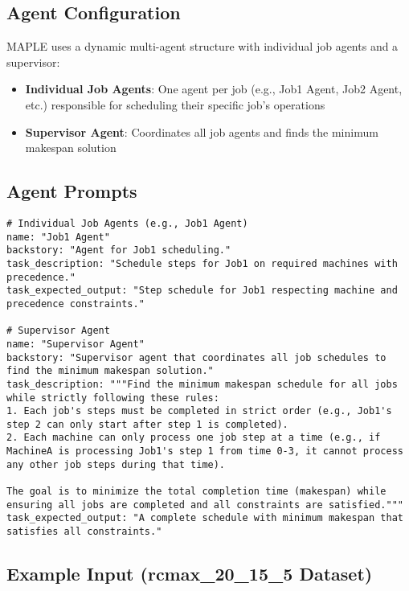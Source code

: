 \documentclass[11pt]{article}
\begin{document}
\subsection{Agent Configuration}

MAPLE uses a dynamic multi-agent structure with individual job agents and a supervisor:

\begin{itemize}
    \item \textbf{Individual Job Agents}: One agent per job (e.g., Job1 Agent, Job2 Agent, etc.) responsible for scheduling their specific job's operations
    \item \textbf{Supervisor Agent}: Coordinates all job agents and finds the minimum makespan solution
\end{itemize}

\subsection{Agent Prompts}

\begin{lstlisting}[caption=MAPLE Agent Prompts]
# Individual Job Agents (e.g., Job1 Agent)
name: "Job1 Agent"
backstory: "Agent for Job1 scheduling."
task_description: "Schedule steps for Job1 on required machines with precedence."
task_expected_output: "Step schedule for Job1 respecting machine and precedence constraints."

# Supervisor Agent
name: "Supervisor Agent"
backstory: "Supervisor agent that coordinates all job schedules to find the minimum makespan solution."
task_description: """Find the minimum makespan schedule for all jobs while strictly following these rules:
1. Each job's steps must be completed in strict order (e.g., Job1's step 2 can only start after step 1 is completed).
2. Each machine can only process one job step at a time (e.g., if MachineA is processing Job1's step 1 from time 0-3, it cannot process any other job steps during that time).

The goal is to minimize the total completion time (makespan) while ensuring all jobs are completed and all constraints are satisfied."""
task_expected_output: "A complete schedule with minimum makespan that satisfies all constraints."
\end{lstlisting}

\subsection{Example Input (rcmax\_20\_15\_5 Dataset)}
\end{document}
